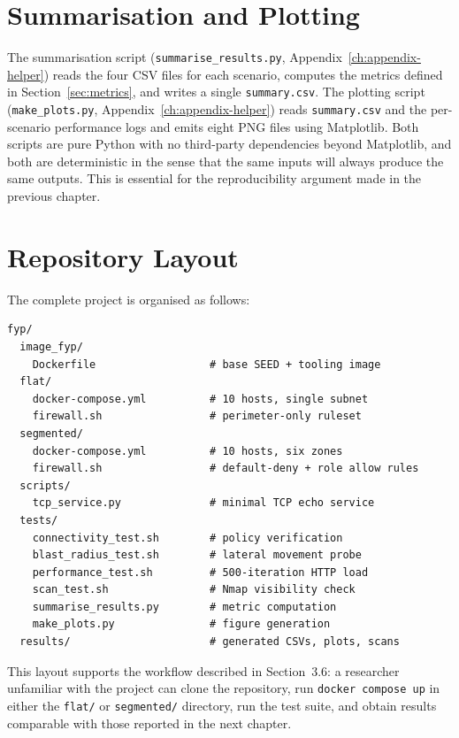 \section{Summarisation and Plotting}

The summarisation script (\texttt{summarise\_results.py}, Appendix~\ref{ch:appendix-helper}) reads the four CSV files for each scenario, computes the metrics defined in Section~\ref{sec:metrics}, and writes a single \texttt{summary.csv}. The plotting script (\texttt{make\_plots.py}, Appendix~\ref{ch:appendix-helper}) reads \texttt{summary.csv} and the per-scenario performance logs and emits eight PNG files using Matplotlib. Both scripts are pure Python with no third-party dependencies beyond Matplotlib, and both are deterministic in the sense that the same inputs will always produce the same outputs. This is essential for the reproducibility argument made in the previous chapter.

\section{Repository Layout}

The complete project is organised as follows:

\begin{lstlisting}[style=shellstyle, caption={Top-level repository layout}]
fyp/
  image_fyp/
    Dockerfile                  # base SEED + tooling image
  flat/
    docker-compose.yml          # 10 hosts, single subnet
    firewall.sh                 # perimeter-only ruleset
  segmented/
    docker-compose.yml          # 10 hosts, six zones
    firewall.sh                 # default-deny + role allow rules
  scripts/
    tcp_service.py              # minimal TCP echo service
  tests/
    connectivity_test.sh        # policy verification
    blast_radius_test.sh        # lateral movement probe
    performance_test.sh         # 500-iteration HTTP load
    scan_test.sh                # Nmap visibility check
    summarise_results.py        # metric computation
    make_plots.py               # figure generation
  results/                      # generated CSVs, plots, scans
\end{lstlisting}

This layout supports the workflow described in Section~3.6: a researcher unfamiliar with the project can clone the repository, run \texttt{docker compose up} in either the \texttt{flat/} or \texttt{segmented/} directory, run the test suite, and obtain results comparable with those reported in the next chapter.
